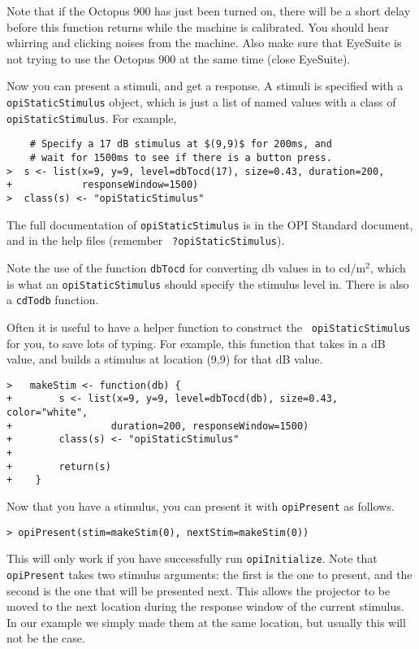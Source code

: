 \documentclass{article}
\begin{document}
Note that if the Octopus 900 has just been turned on, there will
be a short delay before this function returns while the machine is
calibrated. You should hear whirring and clicking noises from the
machine.  Also make sure that EyeSuite is not trying to use the
Octopus 900 at the same time (close EyeSuite).

Now you can present a stimuli, and get a response. A stimuli is specified with a {\tt
opiStaticStimulus} object, which is just a list of named values with a class of {\tt
opiStaticStimulus}. For example, 

\begin{verbatim}
    # Specify a 17 dB stimulus at $(9,9)$ for 200ms, and 
    # wait for 1500ms to see if there is a button press.
>  s <- list(x=9, y=9, level=dbTocd(17), size=0.43, duration=200, 
+            responseWindow=1500)
>  class(s) <- "opiStaticStimulus"
\end{verbatim}

The full documentation of {\tt opiStaticStimulus} is in the
OPI Standard document, and in the help files (remember {\tt
?opiStaticStimulus}).

Note the use of the function {\tt dbTocd} for converting db values
in to cd/m$^2$, which is what an {\tt opiStaticStimulus} should
specify the stimulus level in. There is also a {\tt cdTodb} function.

Often it is useful to have a helper function to construct the {\tt
opiStaticStimulus} for you, to save lots of typing. For example,
this function that takes in a dB value, and builds a stimulus at
location (9,9) for that dB value.

\begin{verbatim}
>   makeStim <- function(db) {
+        s <- list(x=9, y=9, level=dbTocd(db), size=0.43, color="white",
+                 duration=200, responseWindow=1500)
+        class(s) <- "opiStaticStimulus"
+
+        return(s)
+    }
\end{verbatim}            

Now that you have a stimulus, you can present it with {\tt opiPresent} as follows.
\begin{verbatim}
> opiPresent(stim=makeStim(0), nextStim=makeStim(0))
\end{verbatim}            
This will only work if you have successfully run {\tt opiInitialize}.
Note that {\tt opiPresent} takes two stimulus arguments: the first is the one to present, and
the second is the one that will be presented next. This allows the projector to be moved to
the next location during the response window of the current stimulus.
In our example we simply made them at the same location, but usually this will not be the case.
\end{document}

